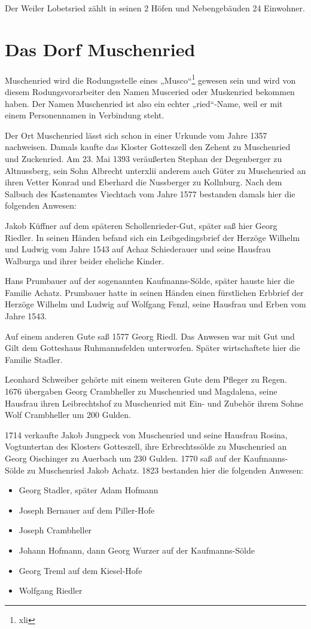 \documentclass{book}
\begin{document}
Der Weiler Lobetsried zählt in seinen 2 Höfen und Nebengebäuden 24
Einwohner.

\section{Das Dorf Muschenried}

Muschenried wird die Rodungsstelle eines „Musco“\footnote{xli} gewesen
sein und wird von diesem Rodungsvorarbeiter den Namen Musceried oder
Muskenried bekommen haben. Der Namen Muschenried ist also ein echter
„ried“-Name, weil er mit einem Personennamen in Verbindung steht.

Der Ort Muschenried lässt sich schon in einer Urkunde vom Jahre 1357
nachweisen. Damals kaufte das Kloster Gotteszell den Zehent zu
Muschenried und Zuckenried. Am 23. Mai 1393 veräußerten Stephan der
Degenberger zu Altnussberg, sein Sohn Albrecht unterxlii anderem auch
Güter zu Muschenried an ihren Vetter Konrad und Eberhard die Nussberger
zu Kollnburg. Nach dem Salbuch des Kastenamtes Viechtach vom Jahre 1577
bestanden damals hier die folgenden Anwesen:

Jakob Küffner auf dem späteren Schollenrieder-Gut, später saß hier Georg
Riedler. In seinen Händen befand sich ein Leibgedingsbrief der Herzöge
Wilhelm und Ludwig vom Jahre 1543 auf Achaz Schiederauer und seine
Hausfrau Walburga und ihrer beider eheliche Kinder.

Hans Prumbauer auf der sogenannten Kaufmanns-Sölde, später hauste hier
die Familie Achatz. Prumbauer hatte in seinen Händen einen fürstlichen
Erbbrief der Herzöge Wilhelm und Ludwig auf Wolfgang Fenzl, seine
Hausfrau und Erben vom Jahre 1543.

Auf einem anderen Gute saß 1577 Georg Riedl. Das Anwesen war mit Gut und
Gilt dem Gotteshaus Ruhmannsfelden unterworfen. Später wirtschaftete
hier die Familie Stadler.

Leonhard Schweiber gehörte mit einem weiteren Gute dem Pfleger zu Regen.
1676 übergaben Georg Crambheller zu Muschenried und Magdalena, seine
Hausfrau ihren Leibrechtshof zu Muschenried mit Ein- und Zubehör ihrem
Sohne Wolf Crambheller um 200 Gulden.

1714 verkaufte Jakob Jungpeck von Muschenried und seine Hausfrau Rosina,
Vogtuntertan des Klosters Gotteszell, ihre Erbrechtssölde zu Muschenried
an Georg Oischinger zu Auerbach um 230 Gulden. 1770 saß auf der
Kaufmanns-Sölde zu Muschenried Jakob Achatz. 1823 bestanden hier die
folgenden Anwesen:

\begin{itemize}
\item Georg Stadler, später Adam Hofmann
\item Joseph Bernauer auf dem Piller-Hofe
\item Joseph Crambheller
\item Johann Hofmann, dann Georg Wurzer auf der Kaufmanns-Sölde
\item Georg Treml auf dem Kiesel-Hofe
\item Wolfgang Riedler
\end{itemize}
\end{document}
